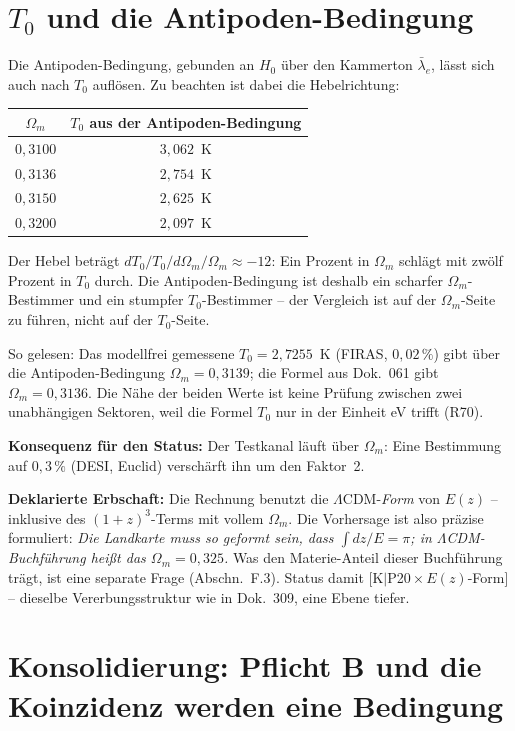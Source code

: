 \section{$T_0$ und die Antipoden-Bedingung}

Die Antipoden-Bedingung, gebunden an $H_0$ über den Kammerton
$\bar\lambda_e$, lässt sich auch nach $T_0$ auflösen. Zu beachten
ist dabei die Hebelrichtung:

\begin{center}
\begin{tabular}{cc}
\toprule
$\Omega_m$ & $T_0$ aus der Antipoden-Bedingung \\
\midrule
$0{,}3100$ & $3{,}062$~K \\
$0{,}3136$ & $2{,}754$~K \\
$0{,}3150$ & $2{,}625$~K \\
$0{,}3200$ & $2{,}097$~K \\
\bottomrule
\end{tabular}
\end{center}

\noindent Der Hebel beträgt $dT_0/T_0 \big/ d\Omega_m/\Omega_m
\approx -12$: Ein Prozent in $\Omega_m$ schlägt mit zwölf Prozent
in $T_0$ durch. Die Antipoden-Bedingung ist deshalb ein scharfer
$\Omega_m$-Bestimmer und ein stumpfer $T_0$-Bestimmer -- der
Vergleich ist auf der $\Omega_m$-Seite zu führen, nicht auf der
$T_0$-Seite.

So gelesen: Das modellfrei gemessene $T_0 = 2{,}7255$~K (FIRAS,
$0{,}02\,\%$) gibt über die Antipoden-Bedingung
$\Omega_m = 0{,}3139$; die Formel aus Dok.~061 gibt
$\Omega_m = 0{,}3136$. Die Nähe der beiden Werte ist keine Prüfung
zwischen zwei unabhängigen Sektoren, weil die Formel $T_0$ nur in
der Einheit eV trifft (R70).

\textbf{Konsequenz für den Status:} Der Testkanal läuft über
$\Omega_m$: Eine Bestimmung auf $0{,}3\,\%$ (DESI, Euclid)
verschärft ihn um den Faktor~2.

\textbf{Deklarierte Erbschaft:} Die Rechnung benutzt die
$\Lambda$CDM-\emph{Form} von $E(z)$ -- inklusive des
$(1{+}z)^3$-Terms mit vollem $\Omega_m$. Die Vorhersage ist also
präzise formuliert: \emph{Die Landkarte muss so geformt sein,
dass $\int dz/E = \pi$; in $\Lambda$CDM-Buchführung heißt das
$\Omega_m = 0{,}325$.} Was den Materie-Anteil dieser Buchführung
trägt, ist eine separate Frage (Abschn.~F.3). Status damit
[K$|$P20\,$\times$\,$E(z)$-Form] -- dieselbe
Vererbungsstruktur wie in Dok.~309, eine Ebene tiefer.

\section{Konsolidierung: Pflicht B und die Koinzidenz werden eine
Bedingung}

